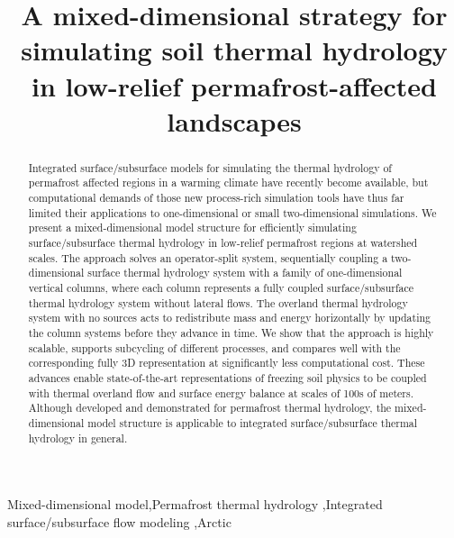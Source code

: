 \documentclass[review]{elsarticle}
\begin{document}
\begin{frontmatter}

\title{A mixed-dimensional strategy for simulating soil thermal hydrology in low-relief permafrost-affected landscapes}





\begin{abstract}
Integrated surface/subsurface models for simulating the thermal hydrology of permafrost affected regions in a warming climate have recently become available, but computational demands of those new process-rich simulation tools have thus far limited their applications to one-dimensional or small two-dimensional simulations. 
We present a mixed-dimensional model structure for efficiently simulating surface/subsurface thermal hydrology in low-relief permafrost regions at watershed scales. The approach solves an operator-split system, sequentially coupling a two-dimensional surface thermal hydrology system with a family of one-dimensional vertical columns, where each column represents a fully coupled surface/subsurface thermal hydrology system without lateral flows. The overland thermal hydrology system with no sources acts to redistribute mass and energy horizontally by updating the column systems before they advance in time. We show that the approach is highly scalable, supports subcycling of different processes, and compares well with the corresponding fully 3D representation at significantly less computational cost. These advances enable state-of-the-art representations of freezing soil physics to be coupled with thermal overland flow and surface energy balance at scales of 100s of meters. Although developed and demonstrated for permafrost thermal hydrology, the mixed-dimensional model structure is applicable to integrated surface/subsurface thermal hydrology in general. 
\end{abstract}

\begin{keyword}
Mixed-dimensional model\sep Permafrost thermal hydrology  \sep Integrated surface/subsurface flow modeling \sep Arctic 
\end{keyword}
\end{frontmatter}
\end{document}
